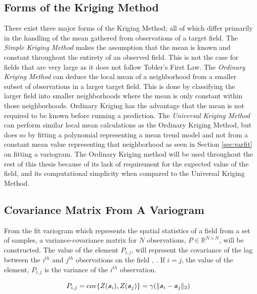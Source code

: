 \subsection{Forms of the Kriging Method}
There exist three major forms of the Kriging Method; all of which differ primarily in the handling of the mean gathered from observations of a target field. The \textit{Simple Kriging Method} makes the assumption that the mean is known and constant throughout the entirety of an observed field. This is not the case for fields that are very large as it does not follow Tobler's First Law. The \textit{Ordinary Kriging Method} can deduce the local mean of a neighborhood from a smaller subset of observations in a larger target field. This is done by classifying the larger field into smaller neighborhoods where the mean is only constant within those neighborhoods. Ordinary Kriging has the advantage that the mean is not required to be known before running a prediction. The \textit{Universal Kriging Method} can perform similar local mean calculations as the Ordinary Kriging Method, but does so by fitting a polynomial representing a mean trend model and not from a constant mean value representing that neighborhood \cite{vandergraaf:nnkrig} as seen in Section \ref{sec:varfit} on fitting a variogram. The Ordinary Kriging method will be used throughout the rest of this thesis because of its lack of requirement for the expected value of the field, and its computational simplicity when compared to the Universal Kriging Method.

\subsection{Covariance Matrix From A Variogram} \label{sec:covmat}
From the fit variogram which represents the spatial statistics of a field from a set of samples, a variance-covariance matrix for $N$ observations, $P \in \mathbb{R}^{N \times N}$, will be constructed. The value of the element $P_{i,j}$, will represent the covariance of the lag between the $i^{th}$ and $j^{th}$ observations on the field \cite{goov:97}, \cite{matheron:geostat}. If $i=j$, the value of the element, $P_{i,j}$ is the variance of the $i^{th}$ observation. 

\begin{equation}
    P_{i,j} = \text{cov}\{Z({\it{\boldsymbol{s}}}_{i}), Z({\it{\boldsymbol{s}}}_{j})\} = \gamma(\| {\it{\boldsymbol{s}}}_i - {\it{\boldsymbol{s}}}_j \|_2)
    \label{eq:covvarmatelem}
\end{equation}

